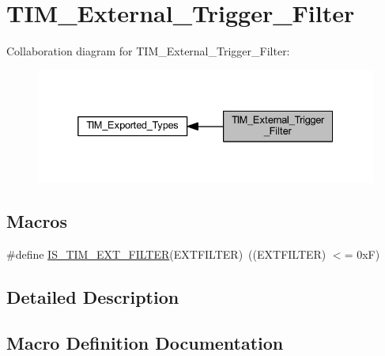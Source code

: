 \hypertarget{group___t_i_m___external___trigger___filter}{}\section{T\+I\+M\+\_\+\+External\+\_\+\+Trigger\+\_\+\+Filter}
\label{group___t_i_m___external___trigger___filter}
Collaboration diagram for T\+I\+M\+\_\+\+External\+\_\+\+Trigger\+\_\+\+Filter\+:
\nopagebreak
\begin{figure}[H]
\begin{center}
\leavevmode
\includegraphics[width=332pt]{group___t_i_m___external___trigger___filter}
\end{center}
\end{figure}
\subsection*{Macros}
\begin{DoxyCompactItemize}
\item 
\#define \hyperlink{group___t_i_m___external___trigger___filter_ga500df0646edcf07316a55a652502ca87}{I\+S\+\_\+\+T\+I\+M\+\_\+\+E\+X\+T\+\_\+\+F\+I\+L\+T\+ER}(E\+X\+T\+F\+I\+L\+T\+ER)~((E\+X\+T\+F\+I\+L\+T\+ER) $<$= 0x\+F)
\end{DoxyCompactItemize}


\subsection{Detailed Description}


\subsection{Macro Definition Documentation}
\mbox{\label{group___t_i_m___external___trigger___filter_ga500df0646edcf07316a55a652502ca87}} 
